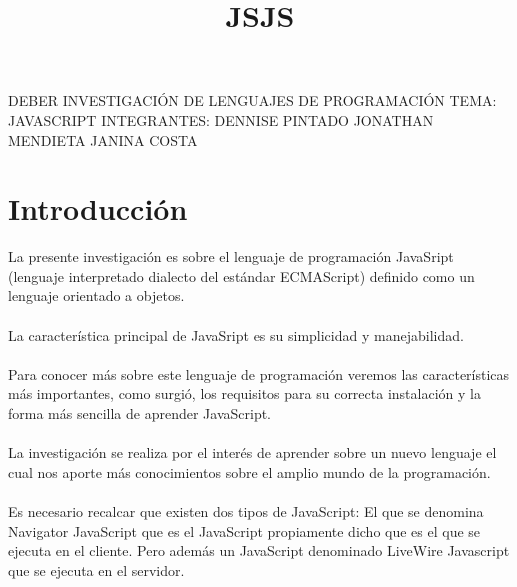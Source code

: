 \documentclass[11pt]{article} %
\title{JS}
\begin{document}
\maketitle


DEBER
INVESTIGACIÓN
\newline
\newline
DE 
\newline
\newline
 LENGUAJES DE PROGRAMACIÓN
\newline
\newline
TEMA:  JAVASCRIPT
\newline
\newline
INTEGRANTES: 
\newline
\newline
DENNISE PINTADO
\newline
\newline
JONATHAN MENDIETA
\newline
\newline
JANINA COSTA
\newline
\newline

\newpage
\title{JS}

\section{Introducción}
La presente investigación es sobre el lenguaje de programación JavaSript  (lenguaje interpretado  dialecto del estándar ECMAScript) definido como un lenguaje orientado a objetos.\\
\\La característica principal de JavaSript es su simplicidad y manejabilidad.\\
\\Para conocer más sobre este lenguaje de programación veremos las características más importantes,  como surgió, los requisitos para su correcta instalación y la forma más sencilla de aprender JavaScript. \\
\\La investigación se realiza por el interés de aprender sobre un nuevo lenguaje el cual nos aporte más conocimientos sobre el amplio mundo de la programación.\\
\\Es necesario recalcar que existen dos tipos de JavaScript: El que se denomina Navigator JavaScript que es el JavaScript propiamente dicho que es el que se ejecuta en el cliente. Pero además un JavaScript denominado LiveWire Javascript que se ejecuta en el servidor.\\
\\ \\
\end{document}
